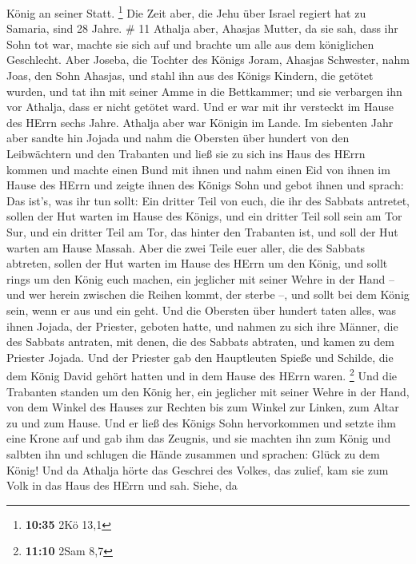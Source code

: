 König an seiner Statt. \footnote{\textbf{10:35} 2Kö 13,1} 
Die Zeit aber, die Jehu über Israel regiert hat zu Samaria, sind 28
Jahre. \# 11  Athalja aber, Ahasjas Mutter, da sie sah, dass
ihr Sohn tot war, machte sie sich auf und brachte um alle aus dem
königlichen Geschlecht.  Aber Joseba, die Tochter des Königs
Joram, Ahasjas Schwester, nahm Joas, den Sohn Ahasjas, und stahl ihn aus
des Königs Kindern, die getötet wurden, und tat ihn mit seiner Amme in
die Bettkammer; und sie verbargen ihn vor Athalja, dass er nicht getötet
ward.  Und er war mit ihr versteckt im Hause des HErrn sechs
Jahre. Athalja aber war Königin im Lande.  Im siebenten Jahr
aber sandte hin Jojada und nahm die Obersten über hundert von den
Leibwächtern und den Trabanten und ließ sie zu sich ins Haus des HErrn
kommen und machte einen Bund mit ihnen und nahm einen Eid von ihnen im
Hause des HErrn und zeigte ihnen des Königs Sohn  und gebot
ihnen und sprach: Das ist's, was ihr tun sollt: Ein dritter Teil von
euch, die ihr des Sabbats antretet, sollen der Hut warten im Hause des
Königs,  und ein dritter Teil soll sein am Tor Sur, und ein
dritter Teil am Tor, das hinter den Trabanten ist, und soll der Hut
warten am Hause Massah.  Aber die zwei Teile euer aller, die
des Sabbats abtreten, sollen der Hut warten im Hause des HErrn um den
König,  und sollt rings um den König euch machen, ein
jeglicher mit seiner Wehre in der Hand -- und wer herein zwischen die
Reihen kommt, der sterbe --, und sollt bei dem König sein, wenn er aus
und ein geht.  Und die Obersten über hundert taten alles,
was ihnen Jojada, der Priester, geboten hatte, und nahmen zu sich ihre
Männer, die des Sabbats antraten, mit denen, die des Sabbats abtraten,
und kamen zu dem Priester Jojada.  Und der Priester gab den
Hauptleuten Spieße und Schilde, die dem König David gehört hatten und in
dem Hause des HErrn waren. \footnote{\textbf{11:10} 2Sam 8,7}
 Und die Trabanten standen um den König her, ein jeglicher
mit seiner Wehre in der Hand, von dem Winkel des Hauses zur Rechten bis
zum Winkel zur Linken, zum Altar zu und zum Hause.  Und er
ließ des Königs Sohn hervorkommen und setzte ihm eine Krone auf und gab
ihm das Zeugnis, und sie machten ihn zum König und salbten ihn und
schlugen die Hände zusammen und sprachen: Glück zu dem König!
 Und da Athalja hörte das Geschrei des Volkes, das zulief,
kam sie zum Volk in das Haus des HErrn  und sah. Siehe, da
